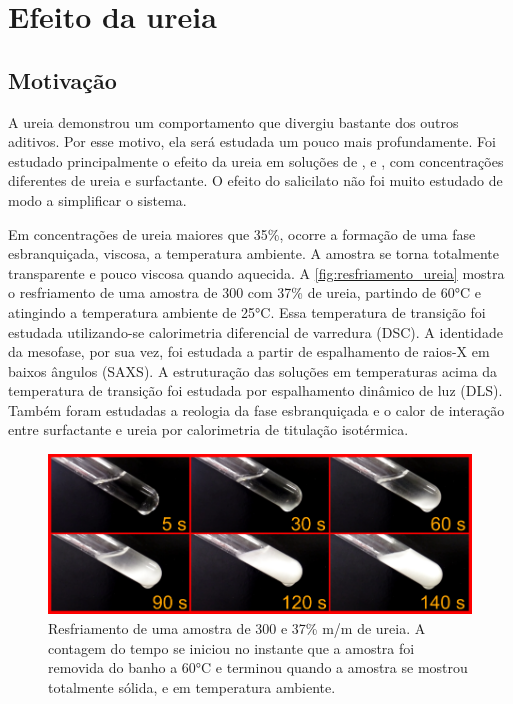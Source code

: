 \chapter{Efeito da ureia}
\label{sec:cap_efeito_ureia}

\section{Motivação}
A ureia demonstrou um comportamento que divergiu bastante dos outros aditivos. Por esse motivo, ela será estudada um pouco mais profundamente. Foi estudado principalmente o efeito da ureia em soluções de \CTAB{}, \TTAB{} e \DTAB, com concentrações diferentes de ureia e surfactante. O efeito do salicilato não foi muito estudado de modo a simplificar o sistema.

Em concentrações de ureia maiores que 35\%, ocorre a formação de uma fase esbranquiçada, viscosa, a temperatura ambiente. A amostra se torna totalmente transparente e pouco viscosa quando aquecida. A \autoref{fig:resfriamento_ureia} mostra o resfriamento de uma amostra de \CTAB{} 300 \mM{} com 37\% de ureia, partindo de 60°C e atingindo a temperatura ambiente de 25°C. Essa temperatura de transição foi estudada utilizando-se calorimetria diferencial de varredura (DSC). A identidade da mesofase, por sua vez, foi estudada a partir de espalhamento de raios-X em baixos ângulos (SAXS). A estruturação das soluções em temperaturas acima da temperatura de transição foi estudada por espalhamento dinâmico de luz (DLS). Também foram estudadas a reologia da fase esbranquiçada e o calor de interação entre surfactante e ureia por calorimetria de titulação isotérmica.

\begin{figure}[h]
	\centering
	\includegraphics[width=\textwidth]{imagens/ureia/tempos}
	\caption{Resfriamento de uma amostra de \CTAB{} 300 \mM{} e 37\% m/m de ureia. A contagem do tempo se iniciou no instante que a amostra foi removida do banho a 60°C e terminou quando a amostra se mostrou totalmente sólida, e em temperatura ambiente.}
	\label{fig:resfriamento_ureia}
\end{figure}


